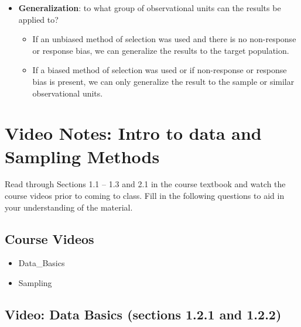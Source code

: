 \documentclass[
]{report}
\begin{document}
\begin{itemize}
  \begin{itemize}
  \item
    \textbf{Selection bias}: method of sampling is biased; some part of the target population is over- or under-represented.
  \item
    \textbf{Non-response bias}: part of a pre-selected sample does not respond or cannot be reached.
  \item
    \textbf{Response bias}: responses are not truthful (poor/leading question phrasing, social desirability).
  \end{itemize}
\item
  \textbf{Generalization}: to what group of observational units can the results be applied to?

  \begin{itemize}
  \item
    If an unbiased method of selection was used and there is no non-response or response bias, we can generalize the results to the target population.
  \item
    If a biased method of selection was used or if non-response or response bias is present, we can only generalize the result to the sample or similar observational units.
  \end{itemize}
\end{itemize}

\newpage

\section{Video Notes: Intro to data and Sampling Methods}\label{video-notes-intro-to-data-and-sampling-methods}


Read through Sections 1.1 -- 1.3 and 2.1 in the course textbook and watch the course videos prior to coming to class. Fill in the following questions to aid in your understanding of the material.

\subsection{Course Videos}\label{course-videos}

\begin{itemize}
\item
  Data\_Basics
\item
  Sampling
\end{itemize}

\subsection*{Video: Data Basics (sections 1.2.1 and 1.2.2)}\label{video-data-basics-sections-1.2.1-and-1.2.2}
\end{document}
